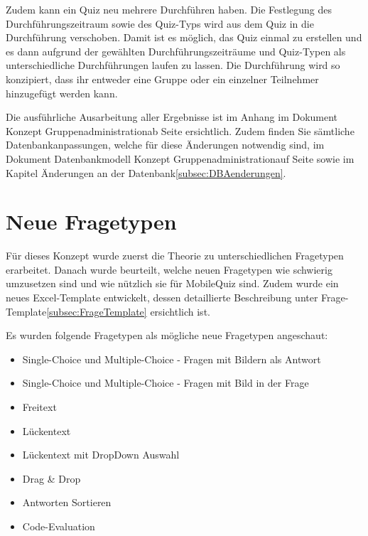 Zudem kann ein Quiz neu mehrere Durchführen haben. Die Festlegung des Durchführungszeitraum sowie des Quiz-Typs wird aus dem Quiz in die Durchführung verschoben. Damit ist es möglich, das Quiz einmal zu erstellen und es dann aufgrund der gewählten Durchführungszeiträume und Quiz-Typen als unterschiedliche Durchführungen laufen zu lassen. Die Durchführung wird so konzipiert, dass ihr entweder eine Gruppe oder ein einzelner Teilnehmer hinzugefügt werden kann. 

\bigskip

Die ausführliche Ausarbeitung aller Ergebnisse ist im Anhang im Dokument \glqq Konzept Gruppenadministration\grqq ab Seite \hyperlink{page.\getpagerefnumber{pdf:gruppenadmin}}{} ersichtlich. Zudem finden Sie sämtliche Datenbankanpassungen, welche für diese Änderungen notwendig sind, im Dokument \glqq Datenbankmodell Konzept Gruppenadministration\grqq auf Seite \hyperlink{page.\getpagerefnumber{pdf:dbgruppenadmin}}{} sowie im Kapitel \glqq Änderungen an der Datenbank\grqq \ref{subsec:DBAenderungen}.


\section{Neue Fragetypen}
Für dieses Konzept wurde zuerst die Theorie zu unterschiedlichen Fragetypen erarbeitet. Danach wurde beurteilt, welche neuen Fragetypen wie schwierig umzusetzen sind und wie nützlich sie für MobileQuiz sind. Zudem wurde ein neues Excel-Template entwickelt, dessen detaillierte Beschreibung unter \glqq Frage-Template\grqq  \ref{subsec:FrageTemplate} ersichtlich ist.

\bigskip

\noindent Es wurden folgende Fragetypen als mögliche neue Fragetypen angeschaut:
\begin{itemize}
	\item Single-Choice und Multiple-Choice - Fragen mit Bildern als Antwort
	\item Single-Choice und Multiple-Choice - Fragen mit Bild in der Frage
	\item Freitext
	\item Lückentext
	\item Lückentext mit DropDown Auswahl
	\item Drag \& Drop
	\item Antworten Sortieren
	\item Code-Evaluation
\end{itemize}

